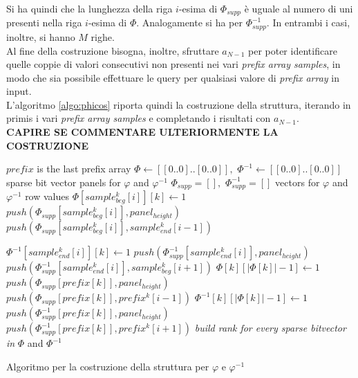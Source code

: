 Si ha quindi che la lunghezza della riga $i$-esima di $\varPhi_{supp}$ è
uguale al numero di uni presenti nella riga $i$-esima di $\varPhi$. Analogamente
si ha per $\varPhi^{-1}_{supp}$. In entrambi i casi, inoltre, si hanno $M$
righe.\\ 
Al fine della costruzione bisogna, inoltre, sfruttare $a_{N-1}$ per poter
identificare quelle coppie di valori consecutivi non presenti nei vari
\textit{prefix array samples}, in modo che sia possibile effettuare le query per
qualsiasi valore di \textit{prefix array} in input.\\
L'algoritmo \ref{algo:phicos} riporta quindi la costruzione della struttura,
iterando in primis i vari \textit{prefix array samples} e completando i
risultati con $a_{N-1}$.\\
\textbf{CAPIRE SE COMMENTARE ULTERIORMENTE LA COSTRUZIONE}
\begin{algorithm}
  \footnotesize
  \begin{algorithmic}[1]
    \Comment  $prefix$ is the last prefix array
    \State $\varPhi\gets [[0..0]..[0..0]],\,\,\varPhi^{-1}\gets
    [[0..0]..[0..0]]$ 
    \Comment sparse bit vector panels for $\varphi$ and $\varphi^{-1}$
    \State $\varPhi_{supp} = [],\,\,\varPhi_{supp}^{-1} = []$
    \Comment vectors for $\varphi$ and $\varphi^{-1}$ row values
    \For {\textit{every} $k\in [0,|cols|)$}
    \For {\textit{every} $i\in [0,|samples_{beg}|)$}
    \State $\varPhi[sample_{beg}^{k}[i]][k]\gets 1$
    \State $push(\varPhi_{supp}[sample_{beg}^{k}[i]], panel_{height})$
    \Else
    \State $push(\varPhi_{supp}[sample_{beg}^{k}[i]],sample_{end}^{k}[i-1])$
    \EndIf

    \State $\varPhi^{-1}[sample_{end}^{k}[i]][k]\gets 1$
    \State $push(\varPhi_{supp}^{-1}[sample_{end}^{k}[i]], panel_{height})$
    \Else
    \State $push(\varPhi_{supp}^{-1}[sample_{end}^{k}[i]],sample_{beg}^{k}[i+1])$
    \EndIf
    \EndFor
    \EndFor
    \For {\textit{every} $k\in [0,|prefix|)$}
    \State $\varPhi[k][|\varPhi[k]|-1]\gets 1$
    \State $push(\varPhi_{supp}[prefix[k]], panel_{height})$
    \Else
    \State $push(\varPhi_{supp}[prefix[k]] ,prefix^k[i-1])$
    \EndIf
    \EndIf
    \State $\varPhi^{-1}[k][|\varPhi[k]|-1]\gets 1$
    \State $push(\varPhi^{-1}_{supp}[prefix[k]], panel_{height})$
    \Else
    \State $push(\varPhi^{-1}_{supp}[prefix[k]],prefix^k[i+1])$
    \EndIf
    \EndIf
    \EndFor
    \State \textit{build rank for every sparse bitvector in} $\varPhi$
    and $\varPhi^{-1}$
    \EndFunction
  \end{algorithmic}
  \caption{Algoritmo per la costruzione della struttura per $\varphi$ e
  $\varphi^{-1}$}
  \label{algo:phicos}
\end{algorithm}
